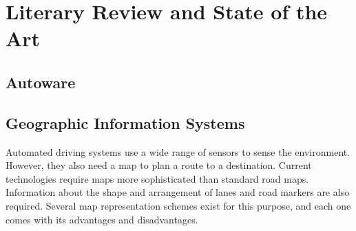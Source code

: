 \documentclass[12pt,twoside]{article}
\begin{document}
\section{Literary Review and State of the Art}
\label{section:LiteraryReviewAndStateOfTheArt}

\subsection{Autoware}

\subsection{Geographic Information Systems}

Automated driving systems use a wide range of sensors to sense the environment. However, they also need a map to plan a route to a destination. Current technologies require maps more sophisticated than standard road maps. Information about the shape and arrangement of lanes and road markers are also required. Several map representation schemes exist for this purpose, and each one comes with its advantages and disadvantages.
\end{document}
